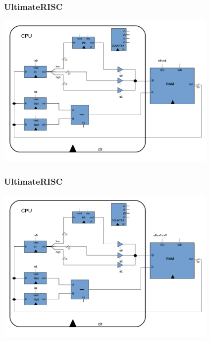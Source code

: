 \documentclass{beamer}
\begin{document}
\begin{frame}%
\frametitle{UltimateRISC}

\vspace{-0.2cm}

\begin{center}
\includegraphics[width=10.8cm]{urisc2.pdf}
\end{center}

\end{frame}

\begin{frame}%
\frametitle{UltimateRISC}

\vspace{-0.2cm}

\begin{center}
\includegraphics[width=10.8cm]{urisc3.pdf}
\end{center}

\end{frame}
\end{document}
